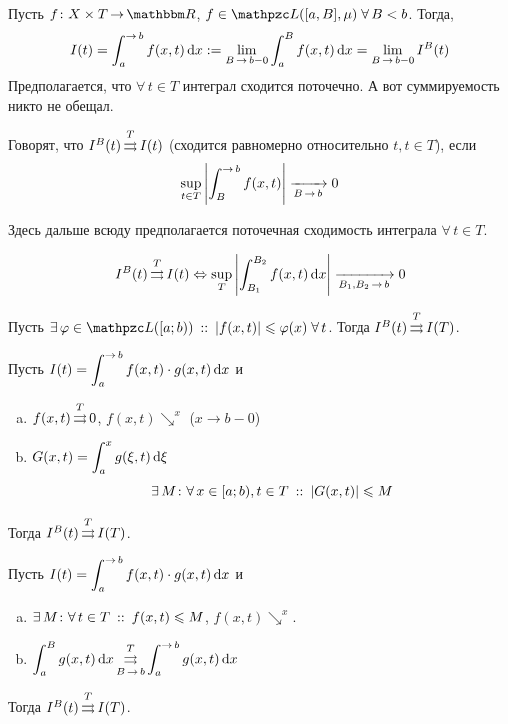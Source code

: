 \documentclass[draft, timbord]{longnotes}
\begin{document}
\begin{defn}\label{defn:meas::paruniconv::improp}
  Пусть $f\colon X \times T \to \R$,
  $f\in \summb([a,B],\mu) \;\forall\, B <b$. Тогда,
  \[
    I(t) = \int_a^{\to b} f(x,t) \, \del x := \lim_{B\to b-0} \int_a^B f(x,t) \, \del x 
    = \lim_{B\to b-0} I^B(t)
  \]
  Предполагается, что $\forall\, t \in T$ интеграл сходится поточечно. А вот суммируемость
  никто не обещал.
\end{defn}


\begin{defn}\label{defn:meas::paruniconv::uniconv}
  Говорят, что $I^B(t) \mathop{\rightrightarrows}\limits^T I(t)$ (сходится равномерно относительно $t, t\in T$), если 
  \[
    \sup_{t\in T} \left| \int_B^{\to b} f(x,t)\right| \xto{B\to b} 0
  \]
\end{defn}

Здесь дальше всюду предполагается поточечная сходимость интеграла $\forall\, t \in T$.

\begin{thrm}\label{thrm:meas::paruniconv::bk}
  \[
    I^B(t) \unito^T I(t) \Leftrightarrow 
    \sup_{T} \left| \int_{B_1}^{B_2} f(x,t)\, \del x \right| \xto{B_1, B_2 \to b} 0
  \]
\end{thrm}

\begin{thrm}\label{thrm:meas::paruniconv::wei}
  Пусть $\exists\, \varphi\in \summb([a;b))\that |f(x,t)| \leqslant \varphi (x)\; \forall\, t$.
  Тогда $I^B(t) \mathop{\rightrightarrows}\limits^T I(T)$.
\end{thrm}

\begin{thrm}\label{thrm:meas::paruniconv::dir}
  Пусть $I(t) = \dint_{a}^{\to b} f(x,t) \cdot g(x,t) \, \del x$ и
  \begin{enumerate}[a)]
    \item $f(x,t) \mathop{\rightrightarrows}\limits^T 0$, $f(x,t) \searrow^x$ ($x\to b-0$)
    \item $G(x,t) = \displaystyle\int_a^x g(\xi, t) \, \mathrm{d} \xi$
      \[
        \exists\, M \colon \forall\, x \in [a;b), t\in T \:::\: | G(x,t) | \leqslant M   
      \]
  \end{enumerate}
  Тогда $I^B(t) \mathop{\rightrightarrows}\limits^T I(T)$.
\end{thrm}

\begin{thrm}\label{thrm:meas::paruniconv::abel}
  Пусть $I(t) = \dint_{a}^{\to b} f(x,t) \cdot g(x,t) \, \del x$ и
  \begin{enumerate}[a)]
    \item $\exists\, M \colon \forall\, t\in T \:::\: f(x,t) \leqslant M$,
      $f(x,t) \searrow^x$.
    \item 
      $\displaystyle
      \int_a^{B} g(x,t) \, \del x \unito^T_{B\to b} \int_a^{\to b} g(x,t) \, \del x 
      $
  \end{enumerate}
  Тогда $I^B(t) \mathop{\rightrightarrows}\limits^T I(T)$.
\end{thrm}
\end{document}
